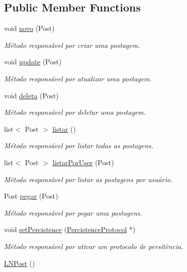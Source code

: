 \subsection*{Public Member Functions}
\begin{DoxyCompactItemize}
\item 
void \hyperlink{class_l_n_post_a3ab3b83674e572c7a8c645c8ea6f447d}{novo} (Post)
\begin{DoxyCompactList}\small\item\em Método responsável por criar uma postagem. \end{DoxyCompactList}\item 
void \hyperlink{class_l_n_post_a76e4575cc5e542510c1f135f879e88f5}{update} (Post)
\begin{DoxyCompactList}\small\item\em Método responsável por atualizar uma postagem. \end{DoxyCompactList}\item 
void \hyperlink{class_l_n_post_a24a5694180c400a4f75b05e3cc2b1b49}{deleta} (Post)
\begin{DoxyCompactList}\small\item\em Método responsável por deletar uma postagem. \end{DoxyCompactList}\item 
list$<$ Post $>$ \hyperlink{class_l_n_post_adb8838a2a49afbc84d17ea8fc4773c7b}{listar} ()
\begin{DoxyCompactList}\small\item\em Método responsável por listar todas as postagens. \end{DoxyCompactList}\item 
list$<$ Post $>$ \hyperlink{class_l_n_post_ad57f97108f666b1c2cc512e8301bc659}{listar\-Por\-User} (Post)
\begin{DoxyCompactList}\small\item\em Método responsável por listar as postagens por usuário. \end{DoxyCompactList}\item 
Post \hyperlink{class_l_n_post_acb5f1b004c87e6cc34afa3890ff09682}{pegar} (Post)
\begin{DoxyCompactList}\small\item\em Método responsável por pegar uma postagens. \end{DoxyCompactList}\item 
void \hyperlink{class_l_n_post_a0f45810ec3c120b544810d9408d013e9}{set\-Percistence} (\hyperlink{class_percistence_protocol}{Percistence\-Protocol} $\ast$)
\begin{DoxyCompactList}\small\item\em Método responsável por ativar um protocolo de persitência. \end{DoxyCompactList}\item 
\hypertarget{class_l_n_post_ad3ca792ffe30c002e26008c5d85061eb}{\hyperlink{class_l_n_post_ad3ca792ffe30c002e26008c5d85061eb}{L\-N\-Post} ()}\label{class_l_n_post_ad3ca792ffe30c002e26008c5d85061eb}


\end{DoxyCompactItemize}
